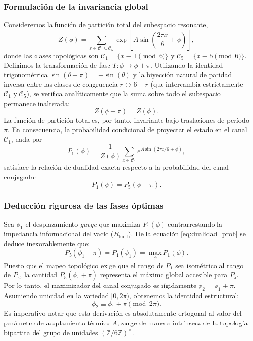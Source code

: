 \documentclass[12pt,a4paper]{article}
\theoremstyle{plain}
\theoremstyle{definition}
\theoremstyle{remark}
\begin{document}
\subsubsection*{Formulación de la invariancia global}

Consideremos la función de partición total del subespacio resonante,
\begin{equation}
Z(\phi) = \sum_{x \in \mathcal{C}_1 \cup \mathcal{C}_5} \exp\left[A \sin\left(\frac{2\pi x}{6} + \phi\right)\right],
\end{equation}
donde las clases topológicas son $\mathcal{C}_1 = \{x \equiv 1 \pmod{6}\}$ y $\mathcal{C}_5 = \{x \equiv 5 \pmod{6}\}$. Definimos la transformación de fase $T: \phi \mapsto \phi + \pi$. Utilizando la identidad trigonométrica $\sin(\theta+\pi) = -\sin(\theta)$ y la biyección natural de paridad inversa entre las clases de congruencia $r \leftrightarrow 6-r$ (que intercambia estrictamente $\mathcal{C}_1$ y $\mathcal{C}_5$), se verifica analíticamente que la suma sobre todo el subespacio permanece inalterada:
\begin{equation}
Z(\phi + \pi) = Z(\phi).
\label{eq:periodicidad_Z}
\end{equation}
La función de partición total es, por tanto, invariante bajo traslaciones de período $\pi$. En consecuencia, la probabilidad condicional de proyectar el estado en el canal $\mathcal{C}_1$, dada por
\begin{equation}
P_1(\phi) = \frac{1}{Z(\phi)}\sum_{x\in\mathcal{C}_1} e^{A\sin(2\pi x/6 + \phi)},
\end{equation}
satisface la relación de dualidad exacta respecto a la probabilidad del canal conjugado:
\begin{equation}
P_1(\phi) = P_5(\phi+\pi).
\label{eq:dualidad_prob}
\end{equation}

\subsubsection*{Deducción rigurosa de las fases óptimas}

Sea $\phi_1$ el desplazamiento \textit{gauge} que maximiza $P_1(\phi)$ contrarrestando la impedancia informacional del vacío ($R_{\text{fund}}$). De la ecuación \eqref{eq:dualidad_prob} se deduce inexorablemente que:
\begin{equation}
P_5(\phi_1+\pi) = P_1(\phi_1) = \max_{\phi} P_1(\phi).
\end{equation}
Puesto que el mapeo topológico exige que el rango de $P_1$ sea isométrico al rango de $P_5$, la cantidad $P_5(\phi_1+\pi)$ representa el máximo global accesible para $P_5$. Por lo tanto, el maximizador del canal conjugado es rígidamente $\phi_2 = \phi_1 + \pi$. Asumiendo unicidad en la variedad $[0, 2\pi)$, obtenemos la identidad estructural:
\begin{equation}
\phi_2 \equiv \phi_1 + \pi \pmod{2\pi}.
\label{eq:relacion_fases}
\end{equation}
Es imperativo notar que esta derivación es absolutamente ortogonal al valor del parámetro de acoplamiento térmico $A$; surge de manera intrínseca de la topología bipartita del grupo de unidades $(\mathbb{Z}/6\mathbb{Z})^{\times}$.
\end{document}
